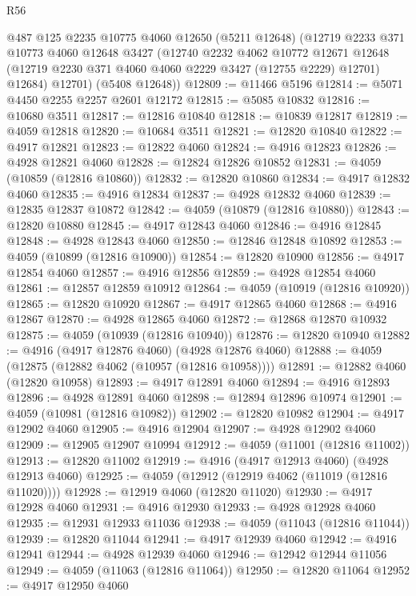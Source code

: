 \begin{lexlean}{R56}
\begin{coremodule}
      @487
      @125
      @2235
      @10775
      @4060
      @12650
      (@5211 @12648)
      (@12719
        @2233
        @371
        @10773
        @4060
        @12648
        @3427
        (@12740
          @2232
          @4062
          @10772
          @12671
          @12648
          (@12719 @2230 @371 @4060 @4060 @2229 @3427 (@12755 @2229) @12701)
          @12684)
        @12701)
      (@5408 @12648))
@12809 := @11466 @5196
@12814 := @5071 @4450 @2255 @2257 @2601 @12172
@12815 := @5085 @10832
@12816 := @10680 @3511
@12817 := @12816 @10840
@12818 := @10839 @12817
@12819 := @4059 @12818
@12820 := @10684 @3511
@12821 := @12820 @10840
@12822 := @4917 @12821
@12823 := @12822 @4060
@12824 := @4916 @12823
@12826 := @4928 @12821 @4060
@12828 := @12824 @12826 @10852
@12831 := @4059 (@10859 (@12816 @10860))
@12832 := @12820 @10860
@12834 := @4917 @12832 @4060
@12835 := @4916 @12834
@12837 := @4928 @12832 @4060
@12839 := @12835 @12837 @10872
@12842 := @4059 (@10879 (@12816 @10880))
@12843 := @12820 @10880
@12845 := @4917 @12843 @4060
@12846 := @4916 @12845
@12848 := @4928 @12843 @4060
@12850 := @12846 @12848 @10892
@12853 := @4059 (@10899 (@12816 @10900))
@12854 := @12820 @10900
@12856 := @4917 @12854 @4060
@12857 := @4916 @12856
@12859 := @4928 @12854 @4060
@12861 := @12857 @12859 @10912
@12864 := @4059 (@10919 (@12816 @10920))
@12865 := @12820 @10920
@12867 := @4917 @12865 @4060
@12868 := @4916 @12867
@12870 := @4928 @12865 @4060
@12872 := @12868 @12870 @10932
@12875 := @4059 (@10939 (@12816 @10940))
@12876 := @12820 @10940
@12882 := @4916 (@4917 @12876 @4060) (@4928 @12876 @4060)
@12888 := @4059 (@12875 (@12882 @4062 (@10957 (@12816 @10958))))
@12891 := @12882 @4060 (@12820 @10958)
@12893 := @4917 @12891 @4060
@12894 := @4916 @12893
@12896 := @4928 @12891 @4060
@12898 := @12894 @12896 @10974
@12901 := @4059 (@10981 (@12816 @10982))
@12902 := @12820 @10982
@12904 := @4917 @12902 @4060
@12905 := @4916 @12904
@12907 := @4928 @12902 @4060
@12909 := @12905 @12907 @10994
@12912 := @4059 (@11001 (@12816 @11002))
@12913 := @12820 @11002
@12919 := @4916 (@4917 @12913 @4060) (@4928 @12913 @4060)
@12925 := @4059 (@12912 (@12919 @4062 (@11019 (@12816 @11020))))
@12928 := @12919 @4060 (@12820 @11020)
@12930 := @4917 @12928 @4060
@12931 := @4916 @12930
@12933 := @4928 @12928 @4060
@12935 := @12931 @12933 @11036
@12938 := @4059 (@11043 (@12816 @11044))
@12939 := @12820 @11044
@12941 := @4917 @12939 @4060
@12942 := @4916 @12941
@12944 := @4928 @12939 @4060
@12946 := @12942 @12944 @11056
@12949 := @4059 (@11063 (@12816 @11064))
@12950 := @12820 @11064
@12952 := @4917 @12950 @4060

\end{coremodule}
\end{lexlean}
